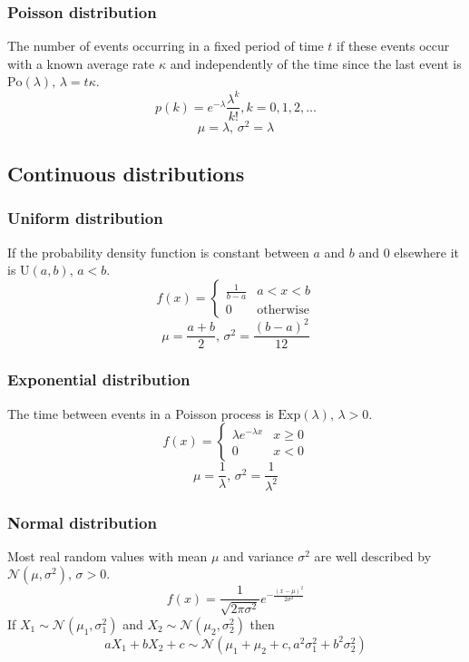 \subsubsection{Poisson distribution}
The number of events occurring in a fixed period of time $t$ if these events occur with a known average rate $\kappa$ and independently of the time since the last event is $\textrm{Po}(\lambda),\,\lambda=t\kappa$.
\[p(k)=e^{-\lambda}\frac{\lambda^k}{k!}, k=0,1,2,\dots\]
\[\mu=\lambda,\,\sigma^2=\lambda\]

\subsection{Continuous distributions}

\subsubsection{Uniform distribution}
If the probability density function is constant between $a$ and $b$ and 0 elsewhere it is $\textrm{U}(a,b),\,a<b$.
\[f(x) = \left\{
\begin{array}{cl}
\frac{1}{b-a} & a<x<b\\
0 & \textrm{otherwise}
\end{array}\right.\]
\[\mu=\frac{a+b}{2},\,\sigma^2=\frac{(b-a)^2}{12}\]

\subsubsection{Exponential distribution}
The time between events in a Poisson process is $\textrm{Exp}(\lambda),\,\lambda>0$.
\[f(x) = \left\{
\begin{array}{cl}
\lambda e^{-\lambda x} & x\geq0\\
0 & x<0
\end{array}\right.\]
\[\mu=\frac{1}{\lambda},\,\sigma^2=\frac{1}{\lambda^2}\]

\subsubsection{Normal distribution}
Most real random values with mean $\mu$ and variance $\sigma^2$ are well described by $\mathcal{N}(\mu,\sigma^2),\,\sigma>0$.
\[ f(x) = \frac{1}{\sqrt{2\pi\sigma^2}}e^{-\frac{(x-\mu)^2}{2\sigma^2}} \]
If $X_1 \sim \mathcal{N}(\mu_1,\sigma_1^2)$ and $X_2 \sim \mathcal{N}(\mu_2,\sigma_2^2)$ then
\[ aX_1 + bX_2 + c \sim \mathcal{N}(\mu_1+\mu_2+c,a^2\sigma_1^2+b^2\sigma_2^2) \]

